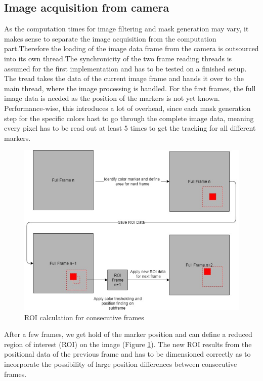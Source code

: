 \subsection{Image acquisition from camera}
As the computation times for image filtering and mask generation may vary, it makes sense to separate the image acquisition from the computation part.Therefore the loading of the image data frame from the camera is outsourced into its own thread.The synchronicity of the two frame reading threads is assumed for the first implementation and has to be tested on a finished setup.
\\
The tread takes the data of the current image frame and hands it over to the main thread, where the image processing is handled. For the first frames, the full image data is needed as the position of the markers is not yet known. Performance-wise, this introduces a lot of overhead, since each mask generation step for the specific colors hast to go through the complete image data, meaning every pixel has to be read out at least 5 times to get the tracking for all different markers.
\begin{figure}[H]
\includegraphics[width=\textwidth]{images/ROI.jpg}
\caption{ROI calculation for consecutive frames}
\label{roi_calc} 
\end{figure}
After a few frames, we get hold of the marker position and can define a reduced region of interest (ROI) on the image (Figure \ref{roi_calc}). The new ROI results from the positional data of the previous frame and has to be dimensioned correctly as to incorporate the possibility of large position differences between consecutive frames.

